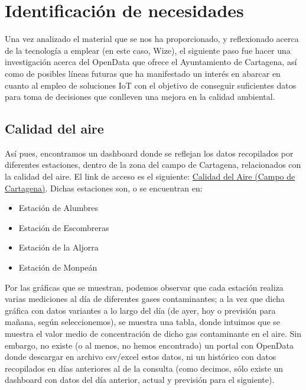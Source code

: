 \documentclass[12pt]{article}
\begin{document}
	\section[Identificación de necesidades]{Identificación de necesidades}
	
	Una vez analizado el material que se nos ha proporcionado, y reflexionado acerca de la tecnología a emplear (en este caso, Wize), el siguiente paso fue hacer una investigación acerca del OpenData que ofrece el Ayuntamiento de Cartagena, así como de posibles líneas futuras que ha manifestado un interés en abarcar en cuanto al empleo de soluciones IoT con el objetivo de conseguir suficientes datos para toma de decisiones que conlleven una mejora en la calidad ambiental. \\
	
	\subsection{Calidad del aire}
	
	Así pues, encontramos un dashboard donde se reflejan los datos recopilados por diferentes estaciones, dentro de la zona del campo de Cartagena, relacionados con la calidad del aire. El link de acceso es el siguiente: 
	\href{https://www.cartagena.es/calidad_aire.asp}{Calidad del Aire (Campo de Cartagena)}. Dichas estaciones son, o se encuentran en: 
	
	\begin{itemize}
		\item Estación de Alumbres
		\item Estación de Escombreras
		\item Estación de la Aljorra
		\item Estación de Monpeán
	\end {itemize}
	
	Por las gráficas que se muestran, podemos observar que cada estación realiza varias mediciones al día de diferentes gases contaminantes; a la vez que dicha gráfica con datos variantes a lo largo del día (de ayer, hoy o previsión para mañana, según seleccionemos), se muestra una tabla, donde intuimos que se muestra el valor medio de concentración de dicho gas contaminante en el aire. Sin embargo, no existe (o al menos, no hemos encontrado) un portal con OpenData donde descargar en archivo csv/excel estos datos, ni un histórico con datos recopilados en días anteriores al de la consulta (como decimos, sólo existe un dashboard con datos del día anterior, actual y previsión para el siguiente). \\
	
\end{document}
